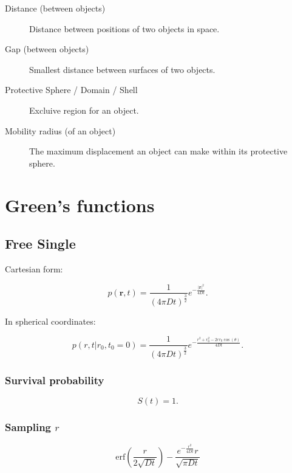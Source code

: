 \documentclass[english]{article}
\begin{document}
\begin{description}
\item[Distance (between objects)] Distance between positions of two
  objects in space.
\item[Gap (between objects)] Smallest distance between surfaces of two objects.
\item[Protective Sphere / Domain / Shell] Excluive region for an object.
\item[Mobility radius (of an object)] The maximum displacement an
  object can make within its protective sphere.

\end{description}



\section{Green's functions}


\subsection{Free Single}

Cartesian form:

\begin{equation}
p(\mathbf{r},t)=
\frac{1}{(4\pi Dt)^{\frac{3}{2}}}e^{-\frac{|\mathbf{r}|^{2}}{4Dt}}.
\end{equation}


In spherical coordinates:

\begin{equation}
  p(r,t|r_{0},t_{0}=0)=
  \frac{1}{(4\pi Dt)^{\frac{3}{2}}}
  e^{-\frac{r^{2}+r_{0}^{2}-2rr_{0}\cos(\theta)}
    {4Dt}}.
\end{equation}


\subsubsection{Survival probability}

\begin{equation}
S(t)=1.
\end{equation}


\subsubsection{Sampling $r$}

\begin{equation}
\mathrm{erf}\left(\frac{r}{2 \sqrt{Dt}}\right) 
- \frac{e^{-\frac{r^2}{4 D t}} r}{\sqrt{\pi D t}}
\end{equation}
\end{document}
